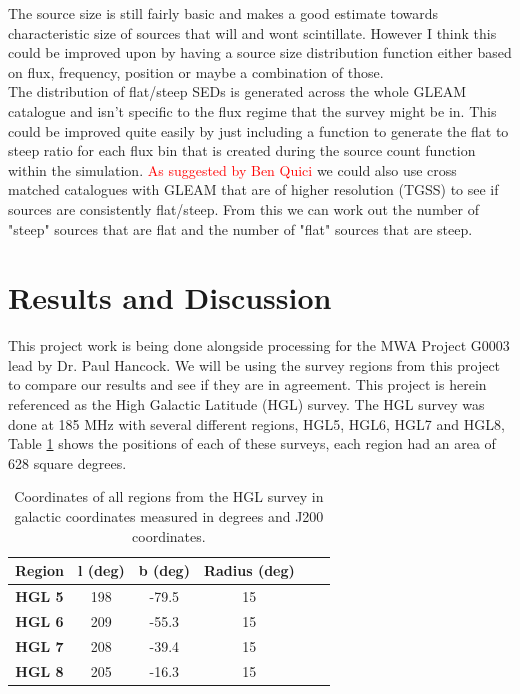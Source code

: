 \documentclass[a4paper, 10pt]{article}
\begin{document}
The source size is still fairly basic and makes a good estimate towards characteristic size of sources that will and wont scintillate. However I think this could be improved upon by having a source size distribution function either based on flux, frequency, position or maybe a combination of those.\\

The distribution of flat/steep SEDs is generated across the whole GLEAM catalogue and isn't specific to the flux regime that the survey might be in. This could be improved quite easily by just including a function to generate the flat to steep ratio for each flux bin that is created during the source count function within the simulation. \textcolor{red}{As suggested by Ben Quici} we could also use cross matched catalogues with GLEAM that are of higher resolution (TGSS) to see if sources are consistently flat/steep. From this we can work out the number of "steep" sources that are flat and the number of "flat" sources that are steep.\\


\section{Results and Discussion}
 This project work is being done alongside processing for the MWA Project G0003 lead by Dr. Paul Hancock. We will be using the survey regions from this project to compare our results and see if they are in agreement. This project is herein referenced as the High Galactic Latitude (HGL) survey. The HGL survey  was done at 185 MHz with several different regions, HGL5, HGL6, HGL7 and HGL8, Table \ref{tab:regs} shows the positions of each of these surveys, each region had an area of 628 square degrees.\\


\begin{table}[H]
\centering
\begin{tabular}{cccccc}
\toprule
\textbf{Region} &\textbf{l (deg)}   & \textbf{b (deg)}    & \textbf{Radius (deg)}\\\midrule

\textbf{HGL 5}  & 198 & -79.5 & 15 \\
\textbf{HGL 6}  & 209 & -55.3 & 15 \\
\textbf{HGL 7}  & 208 & -39.4& 15 \\
\textbf{HGL 8}  & 205 & -16.3 & 15 \\\bottomrule
\end{tabular}
\caption{Coordinates of all regions from the HGL survey in galactic coordinates measured in degrees and J200 coordinates.}
\label{tab:regs}
\end{table}
\end{document}

